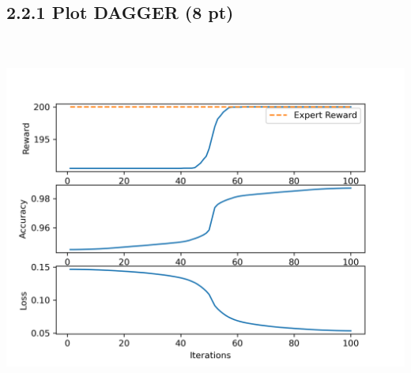 \documentclass[12pt]{article}
\begin{document}
\subsection*{2.2.1 Plot DAGGER (8 pt)}
\begin{tcolorbox}[fit,height=20em, width=40em, blank, borderline={1pt}{1pt},nobeforeafter]
            \begin{center}
            \includegraphics[height= 12cm, width=15.5cm]{q2-2-1}
            \end{center}
\end{tcolorbox}
            
\end{document}

